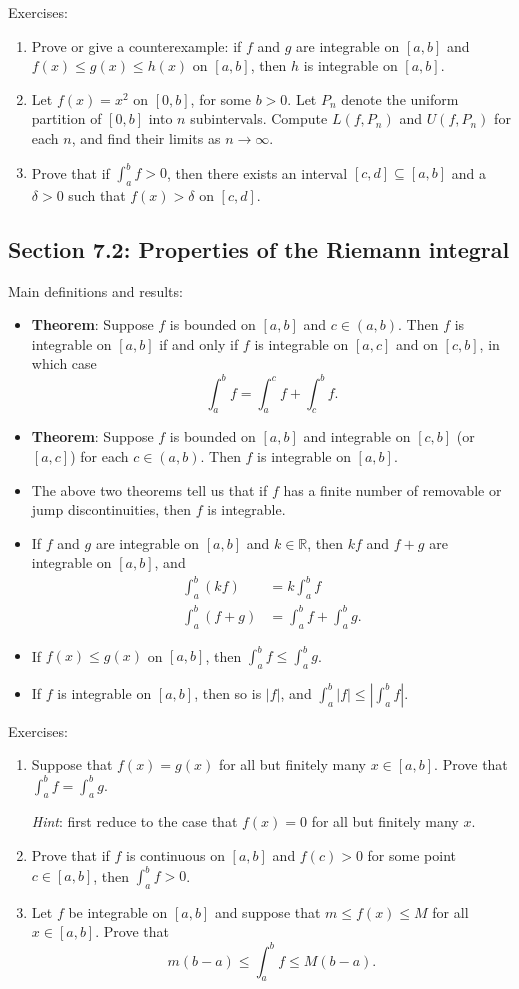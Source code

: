 \documentclass[letterpaper,12pt]{article}
\newcommand{\R}{\mathbb{R}}
\newcommand{\abs}[1]{\lvert #1\rvert}
\begin{document}
\noindent Exercises:

\begin{enumerate}
 \item Prove or give a counterexample: if $f$ and $g$ are integrable on $[a,b]$ and $f(x)\leq g(x)\leq h(x)$ on $[a,b]$, then $h$ is integrable on $[a,b]$.
 \item Let $f(x)=x^2$ on $[0,b]$, for some $b>0$. Let $P_n$ denote the uniform partition of $[0,b]$ into $n$ subintervals. Compute $L(f,P_n)$ and $U(f,P_n)$ for each $n$, and find their limits as $n\to\infty$.
 \item Prove that if $\int_a^b f >0$, then there exists an interval $[c,d]\subseteq [a,b]$ and a $\delta>0$ such that $f(x)>\delta$ on $[c,d]$.
\end{enumerate}
\subsection*{Section 7.2: Properties of the Riemann integral}

Main definitions and results:
\begin{itemize}
 \item {\bf Theorem}: Suppose $f$ is bounded on $[a,b]$ and $c\in (a,b)$. Then $f$ is integrable on $[a,b]$ if and only if $f$ is integrable on $[a,c]$ and on $[c,b]$, in which case
\[
 \int_a^b f = \int_a^c f + \int_c^b f.
\]
 \item {\bf Theorem}: Suppose $f$ is bounded on $[a,b]$ and integrable on $[c,b]$ (or $[a,c]$) for each $c\in (a,b)$. Then $f$ is integrable on $[a,b]$.
 \item The above two theorems tell us that if $f$ has a finite number of removable or jump discontinuities, then $f$ is integrable.
 \item If $f$ and $g$ are integrable on $[a,b]$ and $k\in \R$, then $kf$ and $f+g$ are integrable on $[a,b]$, and
\begin{align*}
 \int_a^b (kf) &= k\int_a^b f\\
 \int_a^b(f+g) & = \int_a^b f + \int_a^b g.
\end{align*}
 \item If $f(x)\leq g(x)$ on $[a,b]$, then $\int_a^b f\leq \int_a^b g$.
 \item If $f$ is integrable on $[a,b]$, then so is $\abs{f}$, and $\int_a^b \abs{f} \leq \left|\int_a^b f\right|$.
\end{itemize}

\noindent Exercises:
\begin{enumerate}
 \item Suppose that $f(x)=g(x)$ for all but finitely many $x\in [a,b]$. Prove that $\int_a^b f = \int_a^b g$.

{\em Hint}: first reduce to the case that $f(x)=0$ for all but finitely many $x$.
\item Prove that if $f$ is continuous on $[a,b]$ and $f(c)>0$ for some point $c\in [a,b]$, then $\int_a^b f>0$.
\item Let $f$ be integrable on $[a,b]$ and suppose that $m\leq f(x)\leq M$ for all $x\in [a,b]$. Prove that
\[
 m(b-a)\leq \int_a^b f\leq M(b-a).
\]
\end{enumerate}
\end{document}
